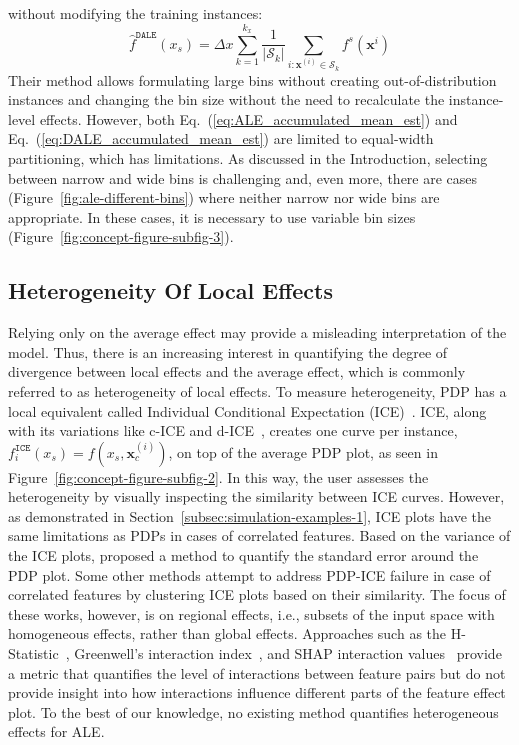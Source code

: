 \documentclass{ecai}  %
\newcommand{\xc}{\mathbf{x}_c}
\begin{document}
without modifying the training instances:
%
\begin{equation}  \label{eq:DALE_accumulated_mean_est}
  \hat{f}^{\mathtt{DALE}}(x_s) = \Delta x \sum_{k=1}^{k_x} \frac{1}{|\mathcal{S}_k|} \sum_{i:\mathbf{x}^{(i)} \in
    \mathcal{S}_k} f^s(\mathbf{x}^i)
\end{equation}
%
Their method allows formulating large bins without creating
out-of-distribution instances and changing the bin size without the
need to recalculate the instance-level effects.  However, both
Eq.~(\ref{eq:ALE_accumulated_mean_est}) and
Eq.~(\ref{eq:DALE_accumulated_mean_est}) are limited to equal-width
partitioning, which has limitations. As discussed in the Introduction,
selecting between narrow and wide bins is challenging and, even more,
there are cases (Figure~\ref{fig:ale-different-bins}) where
neither narrow nor wide bins are appropriate. In these cases, it is
necessary to use variable bin sizes (Figure~\ref{fig:concept-figure-subfig-3}).

\subsection{Heterogeneity Of Local Effects}
\label{subsec:quant-heter-effects}

Relying only on the average effect may provide a misleading interpretation of the model. Thus, there is an increasing interest in quantifying the degree of divergence between local effects and the average effect, which is commonly referred to as heterogeneity of local effects. To measure heterogeneity, PDP has a local equivalent called Individual Conditional Expectation (ICE)~\cite{goldstein2015peeking}.
ICE, along with its variations like c-ICE and d-ICE~\cite{goldstein2015peeking}, creates one curve per instance, \(f^{\mathtt{ICE}}_i(x_s) = f(x_s, \xc^{(i)})\), on top of the average PDP plot, as seen in Figure~\ref{fig:concept-figure-subfig-2}. In this way, the user assesses the heterogeneity by visually inspecting the similarity between ICE curves. However, as demonstrated in Section~\ref{subsec:simulation-examples-1}, ICE plots have the same limitations as PDPs in cases of correlated features.
Based on the variance of the ICE plots, \cite{molnar2021relating} proposed a method to quantify the standard error around the PDP plot. Some other
methods\cite{herbinger2022repid, britton2019vine, molnar2020model}
attempt to address PDP-ICE failure in case of correlated features by
clustering ICE plots based on their similarity.  The focus of these
works, however, is on regional effects, i.e., subsets of the input
space with homogeneous effects, rather than global effects.
Approaches such as the H-Statistic~\cite{friedman2008predictive},
Greenwell's interaction index~\cite{greenwell2018simple}, and SHAP
interaction values~\cite{lundberg2018consistent} provide a metric that
quantifies the level of interactions between feature pairs but do not
provide insight into how interactions influence different parts of the
feature effect plot.  To the best of our knowledge, no existing method
quantifies heterogeneous effects for ALE.
\end{document}
